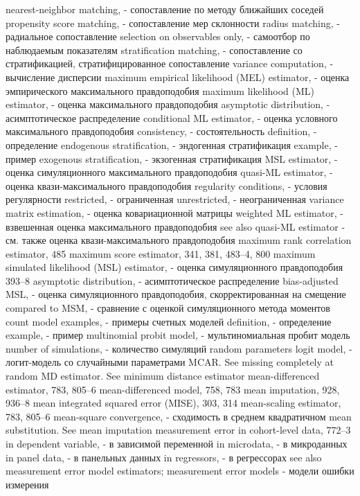 nearest-neighbor matching, - сопоставление по методу ближайших соседей
propensity score matching, - сопоставление мер склонности
radius matching, - радиальное сопоставление
selection on observables only, - самоотбор по наблюдаемым показателям
stratification matching, - сопоставление со стратификацией, стратифицированное сопоставление
variance computation, - вычисление дисперсии
maximum empirical likelihood (MEL) estimator, - оценка эмпирического максимального правдоподобия
maximum likelihood (ML) estimator, - оценка максимального правдоподобия
asymptotic distribution, - асимптотическое распределение
conditional ML estimator, - оценка условного максимального правдоподобия
consistency, - состоятельность
definition, - определение
endogenous stratification, - эндогенная стратификация
example, - пример
exogenous stratification, - экзогенная стратификация
MSL estimator, - оценка симуляционного максимального правдоподобия
quasi-ML estimator, - оценка квази-максимального правдоподобия
regularity conditions, - условия регулярности
restricted, - ограниченная
unrestricted, - неограниченная
variance matrix estimation, - оценка ковариационной матрицы
weighted ML estimator, - взвешенная оценка максимального правдоподобия
see also quasi-ML estimator - см. также оценка квази-максимального правдоподобия
maximum rank correlation estimator, 485 maximum score estimator, 341, 381, 483–4, 800 
maximum simulated likelihood (MSL) estimator, - оценка симуляционного правдоподобия
393–8
asymptotic distribution, - асимптотическое распределение
bias-adjusted MSL, - оценка симуляционного правдоподобия, скорректированная на смещение
compared to MSM, - сравнение с оценкой симуляционного метода моментов
count model examples, - примеры счетных моделей
definition, - определение
example, - пример
multinomial probit model, - мультиномиальная пробит модель
number of simulations, - количество симуляций
random parameters logit model, - логит-модель со случайными параметрами
MCAR. See missing completely at random
MD estimator. See minimum distance estimator mean-differenced estimator, 783, 805–6 mean-differenced model, 758, 783
mean imputation, 928, 936–8
mean integrated squared error (MISE), 303, 314 mean-scaling estimator, 783, 805–6 
mean-square convergence, - сходимость в среднем квадратичном
mean substitution. See mean imputation measurement error
in cohort-level data, 772–3
in dependent variable, - в зависимой переменной
in microdata, - в микроданных
in panel data, - в панельных данных
in regressors, - в регрессорах
see also measurement error model estimators;
measurement error models - модели ошибки измерения
